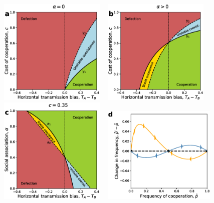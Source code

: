 \documentclass[12pt]{extarticle}
\begin{document}
{\begin{figure}[p]
  \centering       
    \includegraphics[width=0.45\textwidth]{Result2_c_zero_alpha.eps}
	  ~
    \includegraphics[width=0.45\textwidth]{Result2_c_non_zero_alpha.eps}
    ~
    \includegraphics[width=0.45\textwidth]{Result2_alpha.eps}   
    ~
    \includegraphics[width=0.48\textwidth]{coexistence_without_oblique.eps}

\end{figure}}
\end{document}
